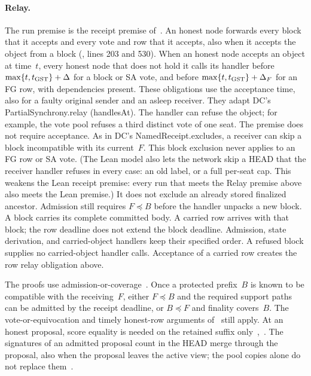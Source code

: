 \documentclass{article}
\theoremstyle{plain}
\theoremstyle{definition}
\theoremstyle{remark}
\begin{document}
\paragraph{Relay.}  The run premise is the receipt premise of~\cite{DC}.
An honest node forwards every block that it accepts and every vote and
row that it accepts, also when it accepts the object from a block
(\cite{DC}, lines 203 and 530).  When an honest node accepts an object
at time~$t$, every honest node that does not hold it calls its handler
before $\max\{t,t_{\rm GST}\}+\Delta$ for a block or SA vote, and before
$\max\{t,t_{\rm GST}\}+\Delta_F$ for an FG row, with dependencies present.
These obligations use the acceptance time, also for a faulty original
sender and an asleep receiver.  They adapt DC's
\textsf{PartialSynchrony.relay} (\textsf{handlesAt}).  The handler can refuse the object; for example,
the vote pool refuses a third distinct vote of one seat.  The premise
does not require acceptance.  As in DC's \textsf{NamedReceipt.excludes},
a receiver can skip a block incompatible with its current~$F$.  This
block exclusion never applies to an FG row or SA vote.  (The Lean model also lets the
network skip a HEAD that the receiver handler refuses in every
case: an old label, or a full per-seat cap.  This weakens the Lean
receipt premise: every run that meets the Relay premise above also meets
the Lean premise.)  It does not exclude an
already stored finalized ancestor.  Admission still requires
$F\preceq B$ before the handler unpacks a new block.
A block carries its complete committed body.  A carried row arrives
with that block; the row deadline does not extend the block deadline.
Admission, state derivation, and carried-object handlers keep their
specified order.  A refused block supplies no carried-object handler
calls.  Acceptance of a carried row creates the row relay obligation above.

The proofs use admission-or-coverage~\cite[\S3]{FB}.  Once a protected
prefix~$B$ is known to be compatible with the receiving~$F$, either
$F\preceq B$ and the required support paths can be admitted by the
receipt deadline, or $B\preceq F$ and finality covers~$B$.  The
vote-or-equivocation and timely honest-row arguments of~\cite[\S3]{RR}
still apply.  At an honest proposal, score equality is needed on the
retained suffix only~\cite[\S4.3]{RR},~\cite[\S6.2]{FB}.  The
signatures of an admitted proposal count in the HEAD merge through the
proposal, also when the proposal leaves the active view; the pool copies
alone do not replace them~\cite[M1]{FR}.
\end{document}
